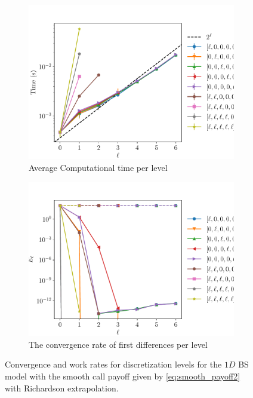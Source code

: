 \documentclass[11pt]{article}
\begin{document}
\begin{figure}[!h]
	\centering
	\begin{subfigure}{.5\textwidth}
		\centering
		\includegraphics[width=0.95\linewidth]{./figures/1D_BS_4_8_steps_smooth_second_payoff_eps_10_5_richardson/level_work.pdf}
		\caption{Average Computational time per level}
		\label{fig:misc_1D_BS_4_8_steps_smooth_second_payoff_eps_10_sub3}
	\end{subfigure}%
	\begin{subfigure}{.5\textwidth}
		\centering
		\includegraphics[width=0.95\linewidth]{./figures/1D_BS_4_8_steps_smooth_second_payoff_eps_10_5_richardson/levels_error_rate.pdf}
		\caption{ The convergence rate of first differences per level}
		\label{fig:misc_1D_BS_4_8_steps_smooth_second_payoff_eps_10_5_sub4}
	\end{subfigure}%
	\caption{Convergence and work rates for discretization levels for the $1D$ BS model with the smooth call payoff given by \eqref{eq:smooth_payoff2} with Richardson extrapolation.}
	\label{fig:misc_1D_BS_4_8_steps_smooth_second_payoff_eps_10_5_2}
\end{figure}
\end{document}

